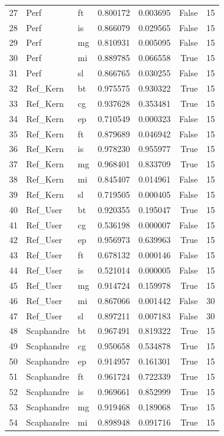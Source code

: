 \begin{tabular}{lllrrrr}
27 & Perf & ft & 0.800172 & 0.003695 & False & 15 \\
28 & Perf & is & 0.866079 & 0.029565 & False & 15 \\
29 & Perf & mg & 0.810931 & 0.005095 & False & 15 \\
30 & Perf & mi & 0.889785 & 0.066558 & True & 15 \\
31 & Perf & sl & 0.866765 & 0.030255 & False & 15 \\
32 & Ref_Kern & bt & 0.975575 & 0.930322 & True & 15 \\
33 & Ref_Kern & cg & 0.937628 & 0.353481 & True & 15 \\
34 & Ref_Kern & ep & 0.710549 & 0.000323 & False & 15 \\
35 & Ref_Kern & ft & 0.879689 & 0.046942 & False & 15 \\
36 & Ref_Kern & is & 0.978230 & 0.955977 & True & 15 \\
37 & Ref_Kern & mg & 0.968401 & 0.833709 & True & 15 \\
38 & Ref_Kern & mi & 0.845407 & 0.014961 & False & 15 \\
39 & Ref_Kern & sl & 0.719505 & 0.000405 & False & 15 \\
40 & Ref_User & bt & 0.920355 & 0.195047 & True & 15 \\
41 & Ref_User & cg & 0.536198 & 0.000007 & False & 15 \\
42 & Ref_User & ep & 0.956973 & 0.639963 & True & 15 \\
43 & Ref_User & ft & 0.678132 & 0.000146 & False & 15 \\
44 & Ref_User & is & 0.521014 & 0.000005 & False & 15 \\
45 & Ref_User & mg & 0.914724 & 0.159978 & True & 15 \\
46 & Ref_User & mi & 0.867066 & 0.001442 & False & 30 \\
47 & Ref_User & sl & 0.897211 & 0.007183 & False & 30 \\
48 & Scaphandre & bt & 0.967491 & 0.819322 & True & 15 \\
49 & Scaphandre & cg & 0.950658 & 0.534878 & True & 15 \\
50 & Scaphandre & ep & 0.914957 & 0.161301 & True & 15 \\
51 & Scaphandre & ft & 0.961724 & 0.722339 & True & 15 \\
52 & Scaphandre & is & 0.969661 & 0.852999 & True & 15 \\
53 & Scaphandre & mg & 0.919468 & 0.189068 & True & 15 \\
54 & Scaphandre & mi & 0.898948 & 0.091716 & True & 15 \\

\end{tabular}
